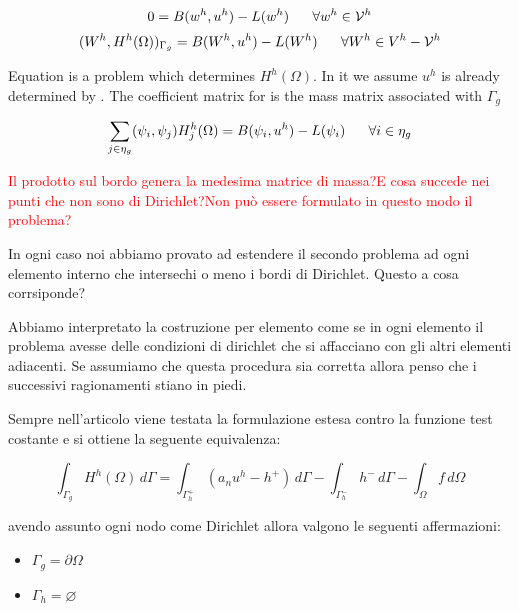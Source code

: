 \begin{equation}
\label{eq: usally problem}
0=B(w^h,u^h)-L(w^h) \psp{10} \forall w^h\in \mathcal{V}^h
\end{equation}
\begin{equation}
\label{eq: problem auxiliary flux}
(W^h,H^h(\Omega))_{\Gamma_g}=B(W^h,u^h)-L(W^h) \psp{10} \forall W^h\in V^h-\mathcal{V}^h
\end{equation}

Equation  is a problem which determines $H^h(\Omega)$. In it we assume $u^h$ is already determined by .
The coefficient matrix for  is the mass matrix associated with $\Gamma_g$

\begin{equation}
\sum_{j\in \eta_g} (\psi_i,\psi_j)H^h_j(\Omega) = B(\psi_i,u^h)-L(\psi_i) \psp{10} \forall i \in \eta_g
\end{equation}

\textcolor{red}{Il prodotto sul bordo genera la medesima matrice di massa?E cosa succede nei punti che non sono di Dirichlet?Non può essere formulato in questo modo il problema?}

In ogni caso noi abbiamo provato ad estendere il secondo problema ad ogni elemento interno che intersechi o meno i bordi di Dirichlet.
Questo a cosa corrsiponde?

Abbiamo interpretato la costruzione per elemento come se in ogni elemento il problema avesse delle condizioni di dirichlet che si affacciano con gli altri elementi adiacenti.
Se assumiamo che questa procedura sia corretta allora penso che i successivi ragionamenti stiano in piedi.

Sempre nell'articolo viene testata la formulazione estesa contro la funzione test costante e si ottiene la seguente equivalenza:

\begin{equation}
\int_{\Gamma_g}H^h(\Omega) \, d\Gamma = \int_{\Gamma^+_h}(a_nu^h-h^+) \, d\Gamma - \int_{\Gamma_h^-}h^- \, d\Gamma - \int_\Omega f \, d\Omega
\end{equation}

avendo assunto ogni nodo come Dirichlet allora valgono le seguenti affermazioni:
\begin{itemize}
\item $\Gamma_g = \partial \Omega$
\item $\Gamma_h = \varnothing$
\end{itemize}


